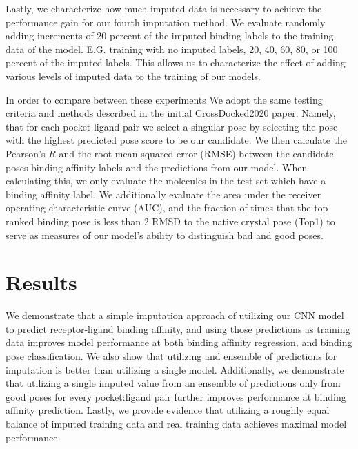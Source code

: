 \documentclass[journal=jmcmar,manuscript=article]{achemso}
\begin{document}
Lastly, we characterize how much imputed data is necessary to achieve the performance gain for our fourth imputation method.
We evaluate randomly adding increments of 20 percent of the imputed binding labels to the training data of the model.
E.G. training with no imputed labels, 20, 40, 60, 80, or 100 percent of the imputed labels.
This allows us to characterize the effect of adding various levels of imputed data to the training of our models.

In order to compare between these experiments We adopt the same testing criteria and methods described in the initial CrossDocked2020 paper\cite{crossdocked2020}.
Namely, that for each pocket-ligand pair we select a singular pose by selecting the pose with the highest predicted pose score to be our candidate. 
We then calculate the Pearson's $R$ and the root mean squared error (RMSE) between the candidate poses binding affinity labels and the predictions from our model.
When calculating this, we only evaluate the molecules in the test set which have a binding affinity label.
We additionally evaluate the area under the receiver operating characteristic curve (AUC), and the fraction of times that the top ranked binding pose is less than 2 RMSD to the native crystal pose (Top1) to serve as measures of our model's ability to distinguish bad and good poses.


\section{Results}
We demonstrate that a simple imputation approach of utilizing our CNN model to predict receptor-ligand binding affinity, and using those predictions as training data improves model performance at both binding affinity regression, and binding pose classification.
We also show that utilizing and ensemble of predictions for imputation is better than utilizing a single model.
Additionally, we demonstrate that utilizing a single imputed value from an ensemble of predictions only from good poses for every pocket:ligand pair further improves performance at binding affinity prediction.
Lastly, we provide evidence that utilizing a roughly equal balance of imputed training data and real training data achieves maximal model performance.
\end{document}

